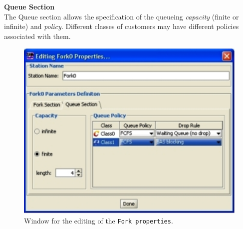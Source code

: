 \noindent \textbf{Queue Section}\\
 The Queue section allows the
specification of the queueing \emph{capacity} (finite or infinite)
and \emph{policy}. Different classes of customers may have
different policies associated with
them.\\
\begin{figure}[htb]
    \begin{center}
        \includegraphics[scale=.6]{img/jsimg/8.22.eps}
    \end{center}
    \caption{Window for the editing of the \texttt{Fork properties}.}
    \label{fig:forkpropwind}
\end{figure}
